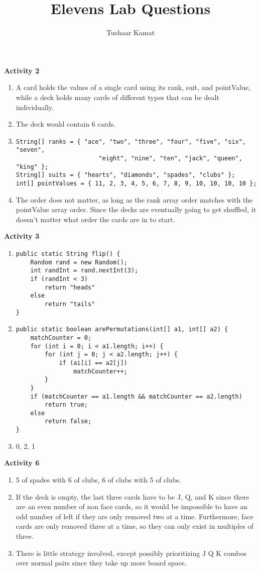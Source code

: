 \documentclass[12pt]{article}
\author{Tushaar Kamat}
\title{Elevens Lab Questions}
\begin{document}
\maketitle

\textbf{Activity 2}
\begin{enumerate}
  \item A card holds the values of a single card using its rank, suit, and
    pointValue, while a deck holds many cards of different types that can be
    dealt individually.
  \item The deck would contain 6 cards. 
  \item 
\begin{verbatim}
String[] ranks = { "ace", "two", "three", "four", "five", "six", "seven", 
                       "eight", "nine", "ten", "jack", "queen", "king" };
String[] suits = { "hearts", "diamonds", "spades", "clubs" };
int[] pointValues = { 11, 2, 3, 4, 5, 6, 7, 8, 9, 10, 10, 10, 10 };
\end{verbatim}
  \item The order does not matter, as long as the rank array order matches with
    the pointValue array order. Since the decks are eventually going to get
    shuffled, it doesn't matter what order the cards are in to start. 
\end{enumerate}

\textbf{Activity 3}
\begin{enumerate}
\item
\begin{verbatim}
public static String flip() {
    Random rand = new Random();
    int randInt = rand.nextInt(3);
    if (randInt < 3) 
        return "heads"
    else 
        return "tails"
}
\end{verbatim}
\item
\begin{verbatim}
public static boolean arePermutations(int[] a1, int[] a2) {
    matchCounter = 0;
    for (int i = 0; i < a1.length; i++) {
        for (int j = 0; j < a2.length; j++) {
            if (ai[i] == a2[j])
                matchCounter++;
        }
    }
    if (matchCounter == a1.length && matchCounter == a2.length)
        return true;
    else 
        return false;
}
\end{verbatim}
\item 0, 2, 1
\end{enumerate}

\textbf{Activity 6}
\begin{enumerate}
\item 5 of spades with 6 of clubs, 6 of clubs with 5 of clubs. 
\item If the deck is empty, the last three cards have to be J, Q, and K since
  there are an even number of non face cards, so it would be impossible to have
  an odd number of left if they are only removed two at a time. Furthermore,
  face cards are only removed three at a time, so they can only exist in
  multiples of three.
\item There is little strategy involved, except possibly prioritizing J Q K
  combos over normal pairs since they take up more board space.
\end{enumerate}
\end{document}
